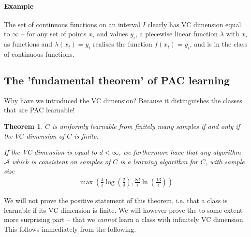 \documentclass{article}
\newcommand{\calA}{\mathcal{A}}
\newtheorem{theorem}{Theorem}
\begin{document}
\paragraph{Example} The set of continuous functions on an interval $I$ clearly has VC dimension equal to $\infty$ -- for any set of points $x_i$ and values $y_i$, a piecewise linear function $\lambda$ with $x_i$ as functions and $\lambda(x_i)=y_i$ realises the function $f(x_i)=y_i$, and is in the class of continuous functions.

\subsection{The 'fundamental theorem' of PAC learning}

Why have we introduced the VC dimension? Because it distinguishes the classes that are PAC learnable!
\begin{theorem}
    $C$ is uniformly learnable from finitely many samples if and only if the $VC$-dimension of $C$ is finite.
    
    If the VC-dimension is equal to $d<\infty$, we furthermore have that any algorithm $\calA$ which is consistent on samples of $C$ is a learning algorithm for $C$, with sample size
    \begin{align*}
        \max \left(\frac{4}{\epsilon}\log\left(\frac{2}{\delta}\right), \frac{8d}{\epsilon}\ln\left(\frac{13}{\epsilon}\right)\right)
    \end{align*}
\end{theorem}

We will not prove the positive statement of this theorem, i.e. that a class is learnable if its VC dimension is finite. We will however prove the to some extent more surprising part -- that we \emph{cannot} learn a class with infinitely VC dimension. This follows immediately from the following.
\end{document}
